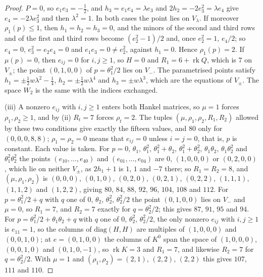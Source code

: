 \documentclass[11pt,reqno]{amsart}
\theoremstyle{plain}
\theoremstyle{definition}
\theoremstyle{remark}
\begin{document}
\begin{proof}
$P=0$, so $e_{1}e_{3}=-\frac12$, and $h_{3}=e_{1}e_{4}=\lambda e_{3}$ and
$2h_{2}=-2e_{3}^{2}=\lambda e_{4}$ give $e_{4}=-2\lambda e_{3}^{2}$ and then
$\lambda^{2}=1$. In both cases the point lies on $V_{\lambda}$. If moreover $\rho_{1}(p)\le1$, then
$h_{1}=h_{2}=h_{3}=0$, and the minors of the second and third rows and of the
first and third rows become $(e_{2}^{2}-1)/2$ and, once $e_{2}^{2}=1$,
$e_{4}/2$; so $e_{4}=0$, $e_{3}^{2}=e_{2}e_{4}=0$ and $e_{1}e_{3}=0\ne
e_{2}^{2}$, against $h_{1}=0$. Hence $\rho_{1}(p)=2$. If $\mu(p)=0$, then
$e_{ij}=0$ for $i,j\ge1$, so $H=0$ and $R_{1}=6+\operatorname{rk}Q$, which is
$7$ on $V_{\pm}$; the point $(0,1,0,0)$ of $p=\theta_{1}^{2}/2$ lies on $V_{-}$.
The parametrised points satisfy $h_{1}=\pm\frac12w\lambda^{2}-\frac14$,
$h_{2}=\pm\frac12w\lambda^{4}$ and $h_{3}=\pm w\lambda^{3}$, which are the
equations of $V_{\pm}$. The space $W_{2}$ is the same with the indices
exchanged.

(iii) A nonzero $e_{ij}$ with $i,j\ge1$ enters both Hankel matrices, so
$\mu=1$ forces $\rho_{1},\rho_{2}\ge1$, and by (ii) $R_{t}=7$ forces
$\rho_{t}=2$. The tuples $(\mu,\rho_{1},\rho_{2},R_{1},R_{2})$ allowed by
these two conditions give exactly the fifteen values, and $80$ only for
$(0,0,0,8,8)$; $\rho_{1}=\rho_{2}=0$ means that $e_{ij}=0$ unless $i=j=0$,
that is, $p$ is constant. Each value is taken. For $p=0$, $\theta_{1}$,
$\theta_{1}^{2}$, $\theta_{1}^{2}+\theta_{2}$, $\theta_{1}^{2}+\theta_{2}^{2}$,
$\theta_{1}\theta_{2}$, $\theta_{1}\theta_{2}^{2}$ and
$\theta_{1}^{2}\theta_{2}^{2}$ the points $(e_{10},\dots,e_{40})$ and
$(e_{01},\dots,e_{04})$ are $0$, $(1,0,0,0)$ or $(0,2,0,0)$, which lie on
neither $V_{\pm}$, as $2h_{1}+1$ is $1$, $1$ and $-7$ there; so $R_{1}=R_{2}=8$,
and $(\mu,\rho_{1},\rho_{2})$ is $(0,0,0)$, $(0,1,0)$, $(0,2,0)$, $(0,2,1)$,
$(0,2,2)$, $(1,1,1)$, $(1,1,2)$ and $(1,2,2)$, giving $80$, $84$, $88$, $92$,
$96$, $104$, $108$ and $112$. For $p=\theta_{1}^{2}/2+q$ with $q$ one of $0$,
$\theta_{2}$, $\theta_{2}^{2}$, $\theta_{2}^{2}/2$ the point $(0,1,0,0)$ lies on
$V_{-}$ and $\mu=0$, so $R_{1}=7$, and $R_{2}=7$ exactly for $q=\theta_{2}^{2}/2$;
this gives $87$, $91$, $95$ and $94$. For $p=\theta_{1}^{2}/2+\theta_{1}\theta_{2}
+q$ with $q$ one of $0$, $\theta_{2}^{2}$, $\theta_{2}^{2}/2$, the only nonzero
$e_{ij}$ with $i,j\ge1$ is $e_{11}=1$, so the columns of $\mathrm{diag}(H,H)$
are multiples of $(1,0,0,0)$ and $(0,0,1,0)$; at $e=(0,1,0,0)$ the columns of
$K^{0}$ span the space of $(1,0,0,0)$, $(0,0,1,0)$ and $(0,1,0,-1)$, so
$\operatorname{rk}K=3$ and $R_{1}=7$, and likewise $R_{2}=7$ for
$q=\theta_{2}^{2}/2$. With $\mu=1$ and $(\rho_{1},\rho_{2})=(2,1)$, $(2,2)$,
$(2,2)$ this gives $107$, $111$ and $110$.


\end{proof}
\end{document}
